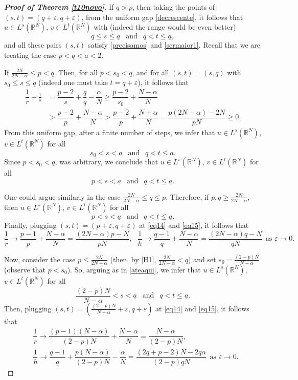 \documentclass[12pt,a4paper]{article}
\numberwithin{equation}{section}
\begin{document}
\begin{proof}[\bf{Proof of Theorem \ref{t10novo}}]
If $q>p$, then taking the points of $(s,t) = (q+\varepsilon, q +\varepsilon)$, from the uniform gap \eqref{decrescente}, it follows that $u\in L^s(\mathbb{R}^N)$, $v \in L^t(\mathbb{R}^N)$ with (indeed the range would be even better)
\[
q \leq s \leq \underline{a} \ \ \text{ and } \ \ q < t \leq \underline{a},
\]
and all these pairs $(s,t)$ satisfy \eqref{precisamos} and \eqref{sermaior1}. Recall that we are treating the case $p< q < \underline{a}<2$.

If $\frac{2N}{2N-\alpha} \leq p < q$. Then, for all $p < s_0 < q$, and for all $(s,t) = (s,q)$ with $s_0 \leq s \leq q$ (indeed one must take $t=q+ \varepsilon$), it follows that
\begin{align}
\dfrac{1}{r} - \frac{1}{s} & = \dfrac{p-2}{s} +\dfrac{q}{q} - \dfrac{\alpha}{N} \geq \dfrac{p-2}{s_0} + \dfrac{N - \alpha}{N} \label{ateaqui} \\
& > \dfrac{p-2}{p} + \dfrac{N-\alpha}{N} > \dfrac{p-2}{p} + \dfrac{N+\alpha}{N} = \dfrac{p(2N-\alpha)-2N}{pN}\geq 0. \nonumber
\end{align}
From this uniform gap, after a finite number of steps, we infer that $u\in L^s(\mathbb{R}^N)$, $v \in L^t(\mathbb{R}^N)$ for all
\[
s_0 <s < \underline{a} \ \ \text{ and } \ \ q < t \leq \underline{a}.
\]
Since $p < s_0< q$, was arbitrary, we conclude that $u\in L^s(\mathbb{R}^N)$, $v \in L^t(\mathbb{R}^N)$ for all
\[
p <s < \underline{a} \ \ \text{ and } \ \ q < t \leq \underline{a}.
\]

One could argue similarly in the case $\frac{2N}{2N -\alpha} \leq q \leq p$. Therefore, if $p,q \geq \frac{2N}{2N-\alpha}$, then $u\in L^s(\mathbb{R}^N)$, $v \in L^t(\mathbb{R}^N)$ for all
\[
p <s < \underline{a} \ \ \text{ and } \ \ q < t \leq \underline{a}.
\]
Finally, plugging $(s,t) = \left( p +\varepsilon, q +\varepsilon \right)$ at \eqref{eq14} and \eqref{eq15}, it follows that
\[
\dfrac{1}{r} \to \dfrac{p-1}{p} + \dfrac{N-\alpha}{N} = \dfrac{(2N-\alpha)p -N}{pN}, \ \ \ \dfrac{1}{h} \to \dfrac{q-1}{q} + \dfrac{N-\alpha}{N} = \dfrac{(2N-\alpha)q -N}{qN} \ \ \text{as $\varepsilon \to 0$.}
\]

Now, consider the case $p \leq \frac{2N}{2N - \alpha}$ (then, by \eqref{H1}, $\frac{2N}{2N - \alpha} < q$) and set $s_0 = \frac{(2-p)N}{N-\alpha}$ (observe that $p <s_0$). So, arguing as in \eqref{ateaqui}, we infer that $u\in L^s(\mathbb{R}^N)$, $v \in L^t(\mathbb{R}^N)$ for all
\[
\dfrac{(2-p)N}{N-\alpha} <s < \underline{a} \ \ \text{ and } \ \ q < t \leq \underline{a}.
\]
Then, plugging $(s,t) = \left( \frac{(2-p)N}{N-\alpha} +\varepsilon, q +\varepsilon \right)$ at \eqref{eq14} and \eqref{eq15}, it follows that
\begin{align*}
&\dfrac{1}{r} \to \dfrac{(p-1)(N-\alpha)}{(2-p)N} + \dfrac{N-\alpha}{N} = \dfrac{N-\alpha}{(2-p)N}, \\ & \dfrac{1}{h} \to \dfrac{q-1}{q} + \dfrac{p(N -\alpha)}{(2-p)N} - \dfrac{\alpha}{N} = \dfrac{(2q+p-2)N - 2q\alpha}{(2-p)qN} \ \ \text{as $\varepsilon \to 0$.}
\end{align*}


\end{proof}
\end{document}

